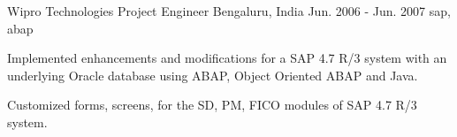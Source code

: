 \cventry
    {Wipro Technologies} %
    {Project Engineer} %
    {Bengaluru, India} %
    {Jun. 2006 - Jun. 2007} %
    { sap, abap } %
    {
    \begin{cvitems} %
        \item { Implemented enhancements and modifications for a SAP 4.7 R/3 system with an underlying Oracle database using ABAP, Object Oriented ABAP and Java.}
        \item { Customized forms, screens, for the SD, PM, FICO modules of SAP 4.7 R/3 system.}
    \end{cvitems}
    }
